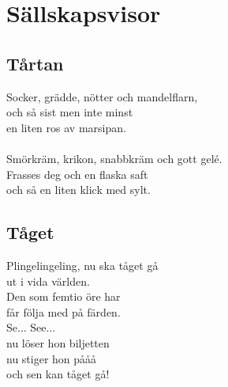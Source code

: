 \chapter{Sällskapsvisor}
\section{Tårtan}
Socker, grädde, nötter och mandelflarn,\\
och så sist men inte minst\\
en liten ros av marsipan.\\
\\
Smörkräm, krikon, snabbkräm och gott gelé.\\
Frasses deg och en flaska saft\\
och så en liten klick med sylt.

\section{Tåget}
Plingelingeling, nu ska tåget gå\\
ut i vida världen.\\
Den som femtio öre har\\
får följa med på färden.\\
Se... See...\\
nu löser hon biljetten\\
nu stiger hon pååå\\
och sen kan tåget gå!

